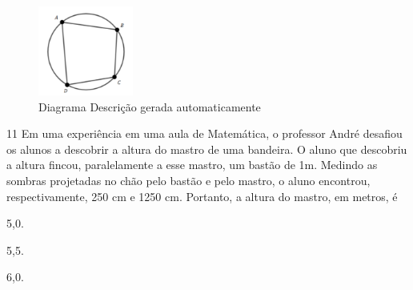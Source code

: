 \begin{escolha}
\begin{boxmedio}
\begin{boxmedio}
{\begin{boxpeq}
\begin{boxpeq}
{\begin{boxpeq}
\begin{boxmedio}
\begin{boxmedio}
\begin{boxpeq}
\begin{boxmedio}
\begin{boxpeq}
\begin{boxpeq}
\begin{boxpeq}
\begin{boxpeq}
\begin{boxmedio}
{\begin{boxmedio}
\begin{boxmedio}
\begin{boxpeq}
\begin{boxmedio}
\begin{boxpeq}
\begin{boxpeq}
\begin{boxpeq}
\begin{escolha}
{\begin{boxmedio}
\begin{boxpeq}
\begin{boxpeq}
\begin{boxpeq}
\begin{boxpeq}
\begin{boxpeq}
\begin{boxmedio}
\begin{boxpeq}
\begin{boxpeq}
\begin{boxpeq}
{\begin{boxpeq}
\begin{boxmedio}
\begin{boxpeq}
\begin{boxpeq}
\begin{boxpeq}
{\begin{boxpeq}
\begin{boxmedio}
{\begin{boxpeq}
\begin{boxpeq}
\begin{boxmedio}
\begin{boxmedio}
\begin{boxpeq}
\begin{boxpeq}
{\begin{boxpeq}
\begin{boxpeq}
\begin{boxpeq}
\begin{boxpeq}
\begin{boxpeq}
\begin{escolha}
\begin{escolha}
{\begin{boxmedio}
\begin{boxpeq}
\begin{q°}
\begin{boxmedio}
\begin{boxpeq}
\begin{boxpeq}
\begin{boxmedio}
\begin{boxmedio}
\begin{boxmedio}
\begin{boxmedio}
{{\begin{figure}
\centering
\includegraphics[width=1.22917in,height=1.15573in]{./_SAEB_9_MAT/media/image254.png}
\caption{Diagrama Descrição gerada automaticamente}
\end{figure}
}

\num{11} Em uma experiência em uma aula de Matemática, o professor André
desafiou os alunos a descobrir a altura do mastro de uma bandeira. O aluno
que descobriu a altura fincou, paralelamente a esse mastro, um bastão de
1m. Medindo as sombras projetadas no chão pelo bastão e pelo mastro,
o aluno encontrou, respectivamente, 250 cm e 1250 cm. Portanto, a altura do
mastro, em metros, é

\begin{escolha}

  \item 5,0.

  \item 5,5.

  \item 6,0.


\end{escolha}}
\end{boxmedio}
\end{boxmedio}
\end{boxmedio}
\end{boxmedio}
\end{boxpeq}
\end{boxpeq}
\end{boxmedio}
\end{q°}
\end{boxpeq}
\end{boxmedio}}
\end{escolha}
\end{escolha}
\end{boxpeq}
\end{boxpeq}
\end{boxpeq}
\end{boxpeq}
\end{boxpeq}}
\end{boxpeq}
\end{boxpeq}
\end{boxmedio}
\end{boxmedio}
\end{boxpeq}
\end{boxpeq}}
\end{boxmedio}
\end{boxpeq}}
\end{boxpeq}
\end{boxpeq}
\end{boxpeq}
\end{boxmedio}
\end{boxpeq}}
\end{boxpeq}
\end{boxpeq}
\end{boxpeq}
\end{boxmedio}
\end{boxpeq}
\end{boxpeq}
\end{boxpeq}
\end{boxpeq}
\end{boxpeq}
\end{boxmedio}}
\end{escolha}
\end{boxpeq}
\end{boxpeq}
\end{boxpeq}
\end{boxmedio}
\end{boxpeq}
\end{boxmedio}
\end{boxmedio}}
\end{boxmedio}
\end{boxpeq}
\end{boxpeq}
\end{boxpeq}
\end{boxpeq}
\end{boxmedio}
\end{boxpeq}
\end{boxmedio}
\end{boxmedio}
\end{boxpeq}}
\end{boxpeq}
\end{boxpeq}}
\end{boxmedio}
\end{boxmedio}
\end{escolha}
